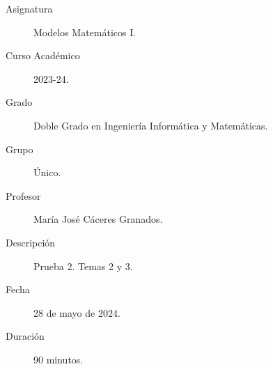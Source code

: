 \documentclass[12pt]{article}
\begin{document}

    
    

    \begin{description}
        \item[Asignatura] Modelos Matemáticos I.
        \item[Curso Académico] 2023-24.
        \item[Grado] Doble Grado en Ingeniería Informática y Matemáticas.
        \item[Grupo] Único.
        \item[Profesor] María José Cáceres Granados.
        \item[Descripción] Prueba 2. Temas 2 y 3.
        \item[Fecha] 28 de mayo de 2024.
        \item[Duración] 90 minutos.
    
    \end{description}
    \newpage
    
\end{document}
